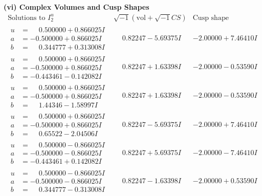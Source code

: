 \documentclass[1p]{elsarticle_modified}
\theoremstyle{definition}
\newcommand{\I}{\sqrt{-1}}
\begin{document}
\newpage\flushleft \textbf{(vi) Complex Volumes and Cusp Shapes}
$$\begin{array}{c|c|c}  
\text{Solutions to }I^u_{2}& \I (\text{vol} + \sqrt{-1}CS) & \text{Cusp shape}\\
 \hline 
\begin{aligned}
u &= \phantom{-}0.500000 + 0.866025 I \\
a &= -0.500000 + 0.866025 I \\
b &= \phantom{-}0.344777 + 0.313008 I\end{aligned}
 & \phantom{-}0.82247 - 5.69375 I & -2.00000 + 7.46410 I \\ \hline\begin{aligned}
u &= \phantom{-}0.500000 + 0.866025 I \\
a &= -0.500000 + 0.866025 I \\
b &= -0.443461 - 0.142082 I\end{aligned}
 & \phantom{-}0.82247 + 1.63398 I & -2.00000 - 0.53590 I \\ \hline\begin{aligned}
u &= \phantom{-}0.500000 + 0.866025 I \\
a &= -0.500000 + 0.866025 I \\
b &= \phantom{-}1.44346 - 1.58997 I\end{aligned}
 & \phantom{-}0.82247 + 1.63398 I & -2.00000 - 0.53590 I \\ \hline\begin{aligned}
u &= \phantom{-}0.500000 + 0.866025 I \\
a &= -0.500000 + 0.866025 I \\
b &= \phantom{-}0.65522 - 2.04506 I\end{aligned}
 & \phantom{-}0.82247 - 5.69375 I & -2.00000 + 7.46410 I \\ \hline\begin{aligned}
u &= \phantom{-}0.500000 - 0.866025 I \\
a &= -0.500000 - 0.866025 I \\
b &= -0.443461 + 0.142082 I\end{aligned}
 & \phantom{-}0.82247 + 5.69375 I & -2.00000 - 7.46410 I \\ \hline\begin{aligned}
u &= \phantom{-}0.500000 - 0.866025 I \\
a &= -0.500000 - 0.866025 I \\
b &= \phantom{-}0.344777 - 0.313008 I\end{aligned}
 & \phantom{-}0.82247 - 1.63398 I & -2.00000 + 0.53590 I \\ \hline\begin{aligned}

\end{aligned}
\end{array}$$
\end{document}
